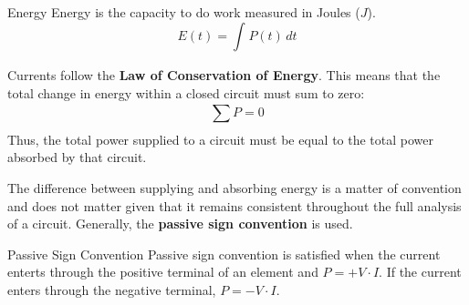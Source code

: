\documentclass[12pt]{article}
\begin{document}
\begin{definition}{Energy}
  Energy is the capacity to do work measured in Joules ($J$).
  \begin{equation*}
    E(t) = \int_{}^{} P(t) \, dt
  \end{equation*}
\end{definition}

Currents follow the \textbf{Law of Conservation of Energy}. This means that the total change in energy within a closed circuit must sum to zero:
\begin{equation*}
  \sum_{}^{} P = 0
\end{equation*}
Thus, the total power supplied to a circuit must be equal to the total power absorbed by that circuit.

The difference between supplying and absorbing energy is a matter of convention and does not matter given that it remains consistent throughout the full analysis of a circuit. Generally, the \textbf{passive sign convention} is used.

\begin{definition}{Passive Sign Convention}
  Passive sign convention is satisfied when the current enterts through the positive terminal of an element and $P=+V \cdot I$. If the current enters through the negative terminal, $P = -V \cdot I$.
\end{definition}
\end{document}
